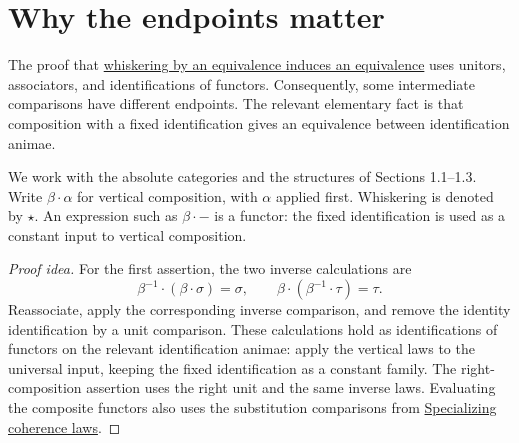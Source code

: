 \documentclass[11pt]{article}
\begin{document}
\section*{Why the endpoints matter}

The proof that \href{equivalences.html\#lem:Whiskering_By_Equivalence}{whiskering
by an equivalence induces an equivalence} uses unitors, associators, and
identifications of functors. Consequently, some intermediate comparisons have
different endpoints. The relevant elementary fact is that composition with
a fixed identification gives an equivalence between identification animae.

We work with the absolute categories and the structures of Sections 1.1--1.3.
Write $\beta\cdot\alpha$ for vertical composition, with $\alpha$ applied
first. Whiskering is denoted by $\star$. An expression such as
$\beta\cdot-$ is a functor: the fixed identification is used as a constant
input to vertical composition.

\begin{proof}[Proof idea]
For the first assertion, the two inverse calculations are
\[
 \beta^{-1}\cdot(\beta\cdot\sigma)=\sigma,
 \qquad
 \beta\cdot(\beta^{-1}\cdot\tau)=\tau.
\]
Reassociate, apply the corresponding inverse comparison, and remove the
identity identification by a unit comparison. These calculations hold as
identifications of functors on the relevant identification animae: apply the
vertical laws to the universal input, keeping the fixed identification as a
constant family. The right-composition assertion uses the right unit and
the same inverse laws. Evaluating the composite functors also uses the
substitution comparisons from
\href{supplementary-specializing-coherence-laws.html}{Specializing coherence laws}.
\end{proof}
\end{document}
